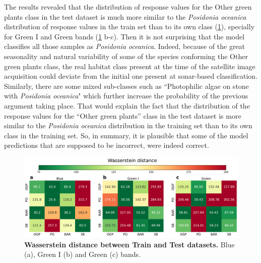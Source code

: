 The results revealed that the distribution of response values for the Other
green plants class in the test dataset is much more similar to the
\textit{Posidonia oceanica} distribution of response values in the train set
than to its own class (\cref{fig:similarity_train_test_classes}), specially for
Green I and Green bands (\cref{fig:similarity_train_test_classes} b-c). Then it
is not surprising that the model classifies all those samples as
\textit{Posidonia oceanica}. Indeed, because of the great seasonality and
natural variability of some of the species conforming the Other green plants
class, the real habitat class present at the time of the satellite image
acquisition could deviate from the initial one present at sonar-based
classification. Similarly, there are some mixed sub-classes
such as ``Photophilic algae on stone with \textit{Posidonia oceanica}" which
further increase the probability of the previous argument taking place. That
would explain the fact that the distribution of the response values for the
``Other green plants'' class in the test dataset is more similar to the
\textit{Posidonia oceanica} distribution in the training set than to its own
class in the training set. So, in summary, it is plausible that some of the
model predictions that are supposed to be incorrect, were indeed correct.

\begin{figure}[H]
    \centering

    \includegraphics[width=\textwidth]{Figures/Wasserstein_distance_by_Classes_&_Datasets.pdf}
    \caption[Wasserstein distance between Train and Test
        datasets]{\textbf{Wasserstein
            distance between Train and Test datasets.} Blue
        (a), Green I (b) and Green (c) bands.}
    \label{fig:similarity_train_test_classes}
\end{figure}

